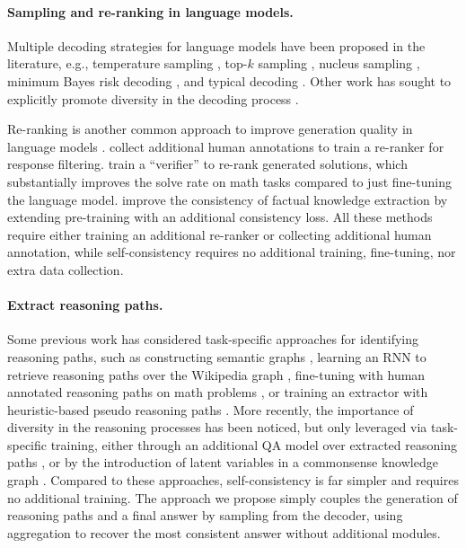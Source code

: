 \documentclass{article} %
\begin{document}
\vspace{-0.12in}
\paragraph{Sampling and re-ranking in language models.}
Multiple decoding strategies for language models have been proposed in the literature, e.g., temperature sampling \citep{ACKLEY1985147,ficler-goldberg-2017-controlling}, top-$k$ sampling \citep{fan-etal-2018-hierarchical,holtzman-etal-2018-learning,Radford2019LanguageMA}, nucleus sampling \citep{nucleus_sampling}, minimum Bayes risk decoding \citep{eikema-aziz-2020-map,shi-etal-2022-natural}, and typical decoding \citep{meister2022typical}.
Other work has sought to explicitly promote diversity in the decoding process \citep{10.1007/978-3-642-33715-4_1,DBLP:journals/corr/LiMJ16,diverse_beam}.

Re-ranking is another common approach to improve generation quality in language models \citep{adiwardana2020humanlike,shen-etal-2021-generate-rank}.
\citet{thoppilan2022lamda} collect additional human annotations to train a re-ranker for response filtering.
\citet{cobbe2021training} train a ``verifier'' to re-rank generated solutions, which substantially improves the solve rate on math tasks compared to just fine-tuning the language model.
\citet{elazar-etal-2021-measuring} improve the consistency of factual knowledge extraction by extending pre-training with an additional consistency loss.
All these methods require either training an additional re-ranker or collecting additional human annotation, while self-consistency requires no additional training, fine-tuning, nor  extra data collection.

\vspace{-0.12in}
\paragraph{Extract reasoning paths.}
Some previous work has considered task-specific approaches for identifying reasoning paths, such as constructing semantic graphs \citep{xu-etal-2021-exploiting-reasoning}, learning an RNN to retrieve reasoning paths over the Wikipedia graph \citep{Asai2020Learning}, fine-tuning with human annotated reasoning paths on math problems \citep{cobbe2021training}, or training an extractor with heuristic-based pseudo reasoning paths %
\citep{DBLP:journals/corr/abs-1910-02610}.
More recently, the importance of diversity in the reasoning processes has been noticed, but only leveraged via task-specific training, either through an additional QA model over extracted reasoning paths \citep{DBLP:journals/corr/abs-1910-02610}, or by the introduction of latent variables in a commonsense knowledge graph \citep{yu2022diversifying}.
Compared to these approaches, self-consistency is far simpler and requires no additional training. The approach we propose simply couples the generation of reasoning paths and a final answer  by sampling from the decoder, using aggregation to recover  the most consistent answer without additional modules.
\end{document}
